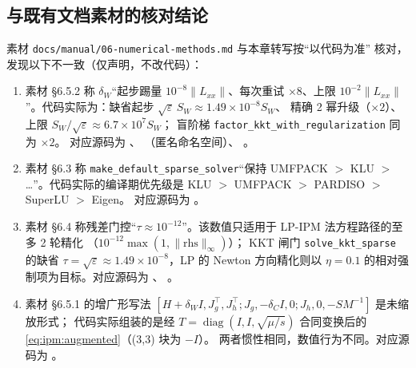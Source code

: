 \subsection{与既有文档素材的核对结论}
\label{subsec:engine-ipm-mismatch}

素材 \texttt{docs/manual/06-numerical-methods.md} 与本章转写按``以代码为准''
核对，发现以下不一致（仅声明，不改代码）：

\begin{enumerate}
  \item 素材 §6.5.2 称 $\delta_W$``起步踢量 $10^{-8}\|L_{xx}\|$、每次重试
        $\times 8$、上限 $10^{-2}\|L_{xx}\|$''。代码实际为：缺省起步
        $\sqrt{\varepsilon}\, S_W \approx 1.49\times10^{-8} S_W$、
        精确 2 幂升级（$\times 2$）、上限 $S_W/\sqrt{\varepsilon}
        \approx 6.7\times10^{7} S_W$；
        盲阶梯 \texttt{factor\_kkt\_with\_regularization} 同为 $\times 2$。
        对应源码为 、
        （匿名命名空间）、
        。
  \item 素材 §6.3 称 \texttt{make\_default\_sparse\_solver}``保持
        UMFPACK $>$ KLU $>$ \ldots''。代码实际的编译期优先级是
        KLU $>$ UMFPACK $>$ PARDISO $>$ SuperLU $>$ Eigen。
        对应源码为 。
  \item 素材 §6.4 称残差门控``$\tau \approx 10^{-12}$''。该数值只适用于
        LP-IPM 法方程路径的至多 2 轮精化
        （$10^{-12}\max(1, \|\mathrm{rhs}\|_{\infty})$）；
        KKT 闸门 \texttt{solve\_kkt\_sparse} 的缺省 $\tau = \sqrt{\varepsilon}
        \approx 1.49\times10^{-8}$，LP 的 Newton 方向精化则以
        $\eta = 0.1$ 的相对强制项为目标。对应源码为
        、
        。
  \item 素材 §6.5.1 的增广形写法 $[H+\delta_W I, J_g^{\top}, J_h^{\top};
        J_g, -\delta_C I, 0; J_h, 0, -S M^{-1}]$ 是未缩放形式；
        代码实际组装的是经 $T = \operatorname{diag}(I, I, \sqrt{\mu/s})$
        合同变换后的 \eqref{eq:ipm:augmented}（(3,3) 块为 $-I$）。
        两者惯性相同，数值行为不同。对应源码为
        。
\end{enumerate}
